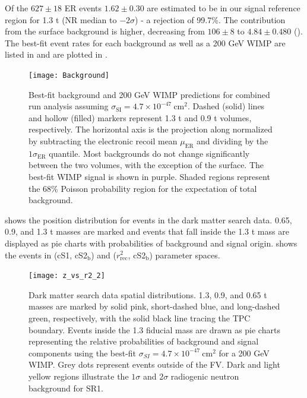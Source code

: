 Of the $627 \pm 18$ ER events $1.62 \pm 0.30$ are estimated to be in our signal reference region for 1.3 t (NR median to
$-2 \sigma$) - a rejection of 99.7\%.  The contribution from the surface background is higher, decreasing from $106 \pm 8$ to
$4.84 \pm 0.480$ ().  The best-fit event rates
for each background as well as a 200 GeV WIMP are listed in  and are plotted in
.

\begin{figure}
\centering
\texttt{[image: Background]}
\caption{Best-fit background and 200 GeV WIMP predictions for combined run analysis assuming
$\sigma_{\mathrm{SI}} = 4.7 \times 10^{-47}\ \mathrm{cm^2}$.  Dashed (solid) lines and hollow (filled)
markers represent 1.3 t and 0.9 t volumes, respectively.  The horizontal axis is the projection along \cstwob normalized by subtracting
the electronic recoil mean $\mu_{\mathrm{ER}}$ and dividing by the $1 \sigma_{\mathrm{ER}}$ quantile.  Most backgrounds do not change
significantly between the two volumes, with the exception of the surface.  The best-fit WIMP signal is shown in purple.  Shaded regions
represent the 68\% Poisson probability region for the expectation of total background.}
\label{fig:dark_matter_results_background}
\end{figure}

 shows the position distribution for events in the dark matter search data.  0.65, 0.9, and 1.3 t
masses are marked and events that fall inside the 1.3 t mass are displayed as pie charts with probabilities of background and
signal origin.   shows the events in (cS1, cS2$_{\mathrm{b}}$) and
($r_{\mathrm{rec}}^2$, cS2$_{\mathrm{b}}$) parameter spaces.

\begin{figure}
\centering
\texttt{[image: z\_vs\_r2\_2]}
\caption{Dark matter search data spatial distributions.  1.3, 0.9, and 0.65 t masses are marked by solid pink, short-dashed blue, and
long-dashed green, respectively, with the solid black line tracing the TPC boundary.  Events inside the 1.3 fiducial mass are drawn as pie
charts representing the relative probabilities of background and signal components using the best-fit
$\sigma_{SI} = 4.7 \times 10^{-47}\ \mathrm{cm^2}$ for a 200 GeV WIMP.  Grey dots represent events outside of the FV.  Dark and light
yellow regions illustrate the $1 \sigma$ and $2 \sigma$ radiogenic neutron background for SR1.}
\label{fig:dark_matter_results_position}
\end{figure}

